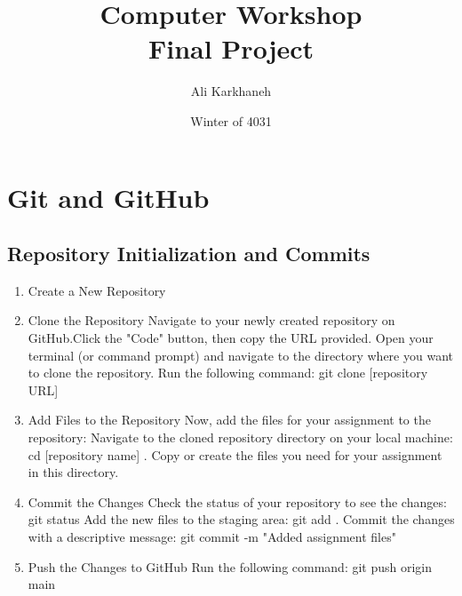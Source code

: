 \documentclass{article}
\title{Computer Workshop \\ Final Project}
\author{Ali Karkhaneh}
\date{Winter of 4031}
\begin{document}
\maketitle
\thispagestyle{empty}
\newpage
\tableofcontents
\thispagestyle{empty}
\newpage
\thispagestyle{noRhead}
\setcounter{page}{1}
\newpage
\section{ Git and GitHub}
\subsection{ Repository Initialization and Commits}
\begin{enumerate}
    \item Create a New Repository
    \item Clone the Repository
    \newline
    \textnormal{Navigate to your newly created repository on GitHub.Click the "Code" button, then copy the URL provided.
    Open your terminal (or command prompt) and navigate to the directory where you want to clone the repository.
    Run the following command: git clone [repository URL]
    }
    \item Add Files to the Repository
    \newline 
    \textnormal{Now, add the files for your assignment to the repository: Navigate to the cloned repository directory on your local machine:
    cd [repository name] . Copy or create the files you need for your assignment in this directory.
    }
    \item Commit the Changes
    \newline 
    \textnormal{Check the status of your repository to see the changes: git status
    Add the new files to the staging area: git add . Commit the changes with a descriptive message: git commit -m "Added assignment files"}
    \item Push the Changes to GitHub
    \newline
    \textnormal{Run the following command: git push origin main
    } 
\end{enumerate}
\end{document}
